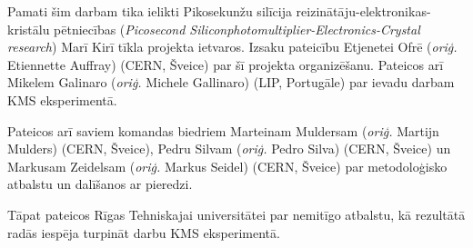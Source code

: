 Pamati šim darbam tika ielikti Pikosekunžu silīcija reizinātāju-elektronikas-kristālu pētniecības (\textit{Picosecond Siliconphotomultiplier-Electronics-Crystal research}) Marī Kirī tīkla projekta ietvaros. Izsaku pateicību Etjenetei Ofrē (\textit{oriģ.} Etiennette Auffray) (CERN, Šveice) par šī projekta organizēšanu. Pateicos arī Mikelem Galinaro (\textit{oriģ.} Michele Gallinaro) (LIP, Portugāle) par ievadu darbam KMS eksperimentā.

Pateicos arī saviem komandas biedriem Marteinam Muldersam (\textit{oriģ.} Martijn Mulders) (CERN, Šveice), Pedru Silvam (\textit{oriģ.} Pedro Silva) (CERN, Šveice) un Markusam Zeidelsam (\textit{oriģ.} Markus Seidel) (CERN, Šveice) par metodoloģisko atbalstu un dalīšanos ar pieredzi.

Tāpat pateicos Rīgas Tehniskajai universitātei par nemitīgo atbalstu, kā rezultātā radās iespēja turpināt darbu KMS eksperimentā.
